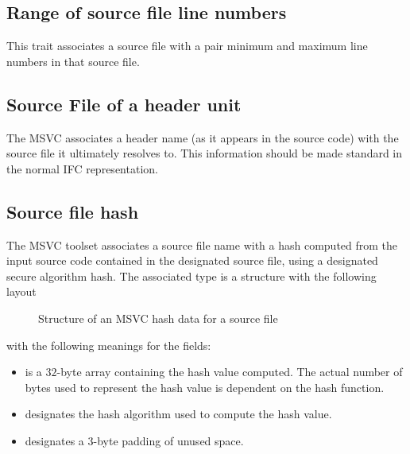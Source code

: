 

\subsection{Range of source file line numbers}
\label{sec:ifc-msvc-source-file-line-range-trait}

This trait associates a source file with a pair minimum and maximum line numbers in that source file.



\subsection{Source File of a header unit}
\label{sec:ifc-msvc-header-unit-source-file-trait}

The MSVC associates a header name (as it appears in the source code) with the source file it ultimately resolves to.
This information should be made standard in the normal IFC representation.



\subsection{Source file hash}
\label{sec:ifc-msvc-source-file-hash-trait}

The MSVC toolset associates a source file name with a hash computed from the input source code contained in 
the designated source file, using a designated secure algorithm hash. 
The associated type  is a structure with the following  layout
%
\begin{figure}[H]
	\centering
	\caption{Structure of an MSVC hash data for a source file}
	\label{fig:ifc-msvc-hash-file-data-structure}
\end{figure}
%
with the following meanings for the fields:
\begin{itemize}
	\item {} is a $32$-byte array containing the hash value computed.  The actual number of bytes
		used to represent the hash value is dependent on the hash function.
	\item {} designates the hash algorithm used to compute the hash value.
	\item {} designates a $3$-byte padding of unused space.
\end{itemize}

